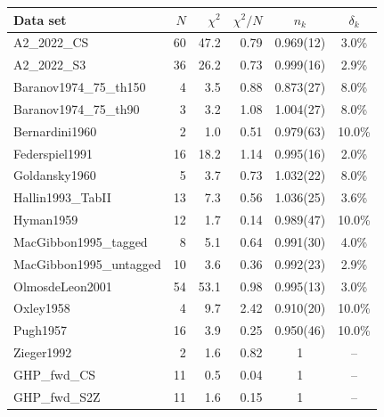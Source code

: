\begin{tabular}{lrrrcc}
\hline
Data set & $N$ & $\chi^2$ & $\chi^2/N$ & $n_k$ & $\delta_k$ \\
\hline
A2\_2022\_CS & 60 & 47.2 & 0.79 & 0.969(12) & 3.0\% \\
A2\_2022\_S3 & 36 & 26.2 & 0.73 & 0.999(16) & 2.9\% \\
Baranov1974\_75\_th150 & 4 & 3.5 & 0.88 & 0.873(27) & 8.0\% \\
Baranov1974\_75\_th90 & 3 & 3.2 & 1.08 & 1.004(27) & 8.0\% \\
Bernardini1960 & 2 & 1.0 & 0.51 & 0.979(63) & 10.0\% \\
Federspiel1991 & 16 & 18.2 & 1.14 & 0.995(16) & 2.0\% \\
Goldansky1960 & 5 & 3.7 & 0.73 & 1.032(22) & 8.0\% \\
Hallin1993\_TabII & 13 & 7.3 & 0.56 & 1.036(25) & 3.6\% \\
Hyman1959 & 12 & 1.7 & 0.14 & 0.989(47) & 10.0\% \\
MacGibbon1995\_tagged & 8 & 5.1 & 0.64 & 0.991(30) & 4.0\% \\
MacGibbon1995\_untagged & 10 & 3.6 & 0.36 & 0.992(23) & 2.9\% \\
OlmosdeLeon2001 & 54 & 53.1 & 0.98 & 0.995(13) & 3.0\% \\
Oxley1958 & 4 & 9.7 & 2.42 & 0.910(20) & 10.0\% \\
Pugh1957 & 16 & 3.9 & 0.25 & 0.950(46) & 10.0\% \\
Zieger1992 & 2 & 1.6 & 0.82 & 1 & -- \\
GHP\_fwd\_CS & 11 & 0.5 & 0.04 & 1 & -- \\
GHP\_fwd\_S2Z & 11 & 1.6 & 0.15 & 1 & -- \\
\hline
\end{tabular}

